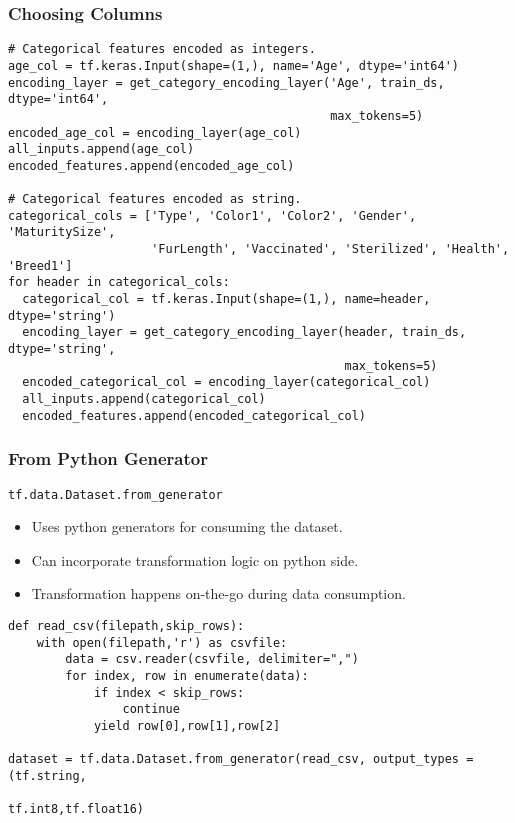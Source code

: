 \begin{frame}[fragile]\frametitle{Choosing Columns}

\begin{lstlisting}
# Categorical features encoded as integers.
age_col = tf.keras.Input(shape=(1,), name='Age', dtype='int64')
encoding_layer = get_category_encoding_layer('Age', train_ds, dtype='int64',
                                             max_tokens=5)
encoded_age_col = encoding_layer(age_col)
all_inputs.append(age_col)
encoded_features.append(encoded_age_col)

# Categorical features encoded as string.
categorical_cols = ['Type', 'Color1', 'Color2', 'Gender', 'MaturitySize',
                    'FurLength', 'Vaccinated', 'Sterilized', 'Health', 'Breed1']
for header in categorical_cols:
  categorical_col = tf.keras.Input(shape=(1,), name=header, dtype='string')
  encoding_layer = get_category_encoding_layer(header, train_ds, dtype='string',
                                               max_tokens=5)
  encoded_categorical_col = encoding_layer(categorical_col)
  all_inputs.append(categorical_col)
  encoded_features.append(encoded_categorical_col)
\end{lstlisting}

\end{frame}

\begin{frame}[fragile]\frametitle{From Python Generator}
\lstinline|tf.data.Dataset.from_generator|

\begin{itemize}
\item Uses python generators for consuming the dataset.
\item Can incorporate transformation logic on python side.
\item Transformation happens on-the-go during data consumption.
\end{itemize}

\begin{lstlisting}
def read_csv(filepath,skip_rows):
	with open(filepath,'r') as csvfile:
		data = csv.reader(csvfile, delimiter=",")
		for index, row in enumerate(data):
			if index < skip_rows:
				continue
			yield row[0],row[1],row[2]
			
dataset = tf.data.Dataset.from_generator(read_csv, output_types =(tf.string,
																					tf.int8,tf.float16)
\end{lstlisting}
\end{frame}

